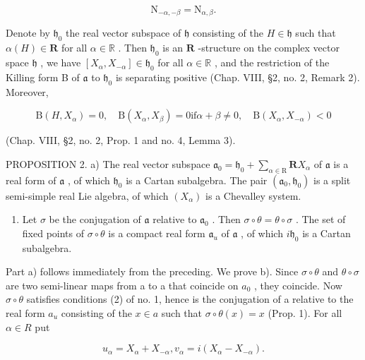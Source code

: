 \[
\mathrm{N} _ {- \alpha , - \beta} = \mathrm{N} _ {\alpha , \beta}.\tag{4}
\]

Denote by \(\mathfrak{h}_0\) the real vector subspace of \(\mathfrak{h}\) consisting of the \(H\in \mathfrak{h}\) such that \(\alpha (H)\in \mathbf{R}\) for all \(\alpha \in \mathbb{R}\) . Then \(\mathfrak{h}_0\) is an \(\mathbf{R}\) -structure on the complex vector space \(\mathfrak{h}\) , we have \([X_{\alpha},X_{-\alpha}]\in \mathfrak{h}_0\) for all \(\alpha \in \mathbb{R}\) , and the restriction of the Killing form B of \(\mathfrak{a}\) to \(\mathfrak{h}_0\) is separating positive (Chap. VIII, §2, no. 2, Remark 2). Moreover,

\[
\mathrm{B} (H, X _ {\alpha}) = 0, \quad \mathrm{B} (X _ {\alpha}, X _ {\beta}) = 0 \text {if} \alpha + \beta \neq 0, \quad \mathrm{B} (X _ {\alpha}, X _ {- \alpha}) <   0\tag{5}
\]

(Chap. VIII, §2, no. 2, Prop. 1 and no. 4, Lemma 3).

PROPOSITION 2. a) The real vector subspace \(\mathfrak{a}_0 = \mathfrak{h}_0 + \sum_{\alpha \in \mathrm{R}} \mathbf{R}X_\alpha\) of \(\mathfrak{a}\) is a real form of \(\mathfrak{a}\) , of which \(\mathfrak{h}_0\) is a Cartan subalgebra. The pair \((\mathfrak{a}_0, \mathfrak{h}_0)\) is a split semi-simple real Lie algebra, of which \((X_\alpha)\) is a Chevalley system.

\begin{enumerate}
\def\labelenumi{\alph{enumi})}
\setcounter{enumi}{1}
\tightlist
\item
  Let \(\sigma\) be the conjugation of \(\mathfrak{a}\) relative to \(\mathfrak{a}_0\) . Then \(\sigma \circ \theta = \theta \circ \sigma\) . The set of fixed points of \(\sigma \circ \theta\) is a compact real form \(\mathfrak{a}_u\) of \(\mathfrak{a}\) , of which \(i\mathfrak{h}_0\) is a Cartan subalgebra.
\end{enumerate}

Part a) follows immediately from the preceding. We prove b). Since \(\sigma\circ\theta\) and \(\theta\circ\sigma\) are two semi-linear maps from a to a that coincide on \(a_{0}\) , they coincide. Now \(\sigma\circ\theta\) satisfies conditions (2) of no. 1, hence is the conjugation of a relative to the real form \(a_{u}\) consisting of the \(x\in a\) such that \(\sigma\circ\theta(x)=x\) (Prop. 1). For all \(\alpha\in R\) put

\[
u _ {\alpha} = X _ {\alpha} + X _ {- \alpha}, v _ {\alpha} = i (X _ {\alpha} - X _ {- \alpha}).\tag{6}
\]

